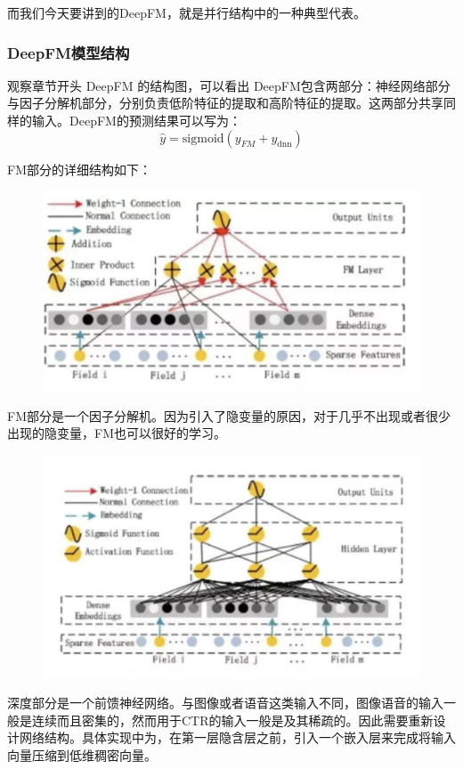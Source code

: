\documentclass[12pt]{article}
\begin{document}
而我们今天要讲到的DeepFM，就是并行结构中的一种典型代表。

\subsubsection{DeepFM模型结构}
观察章节开头 DeepFM 的结构图，可以看出 DeepFM包含两部分：神经网络部分与因子分解机部分，分别负责低阶特征的提取和高阶特征的提取。这两部分共享同样的输入。DeepFM的预测结果可以写为：
$$
\hat{y} = \text{sigmoid}(y_{FM} + y_{\text{dnn}})
$$


FM部分的详细结构如下：
\begin{figure}[H]
    \centering
    \includegraphics[width=.8\textwidth]{fig/DeepFM_FM_Detail.png}
\end{figure}

FM部分是一个因子分解机。因为引入了隐变量的原因，对于几乎不出现或者很少出现的隐变量，FM也可以很好的学习。


\begin{figure}[H]
    \centering
    \includegraphics[width=.8\textwidth]{fig/DeepFM_Deep_Detail.png}
\end{figure}

深度部分是一个前馈神经网络。与图像或者语音这类输入不同，图像语音的输入一般是连续而且密集的，然而用于CTR的输入一般是及其稀疏的。因此需要重新设计网络结构。具体实现中为，在第一层隐含层之前，引入一个嵌入层来完成将输入向量压缩到低维稠密向量。
\end{document}
